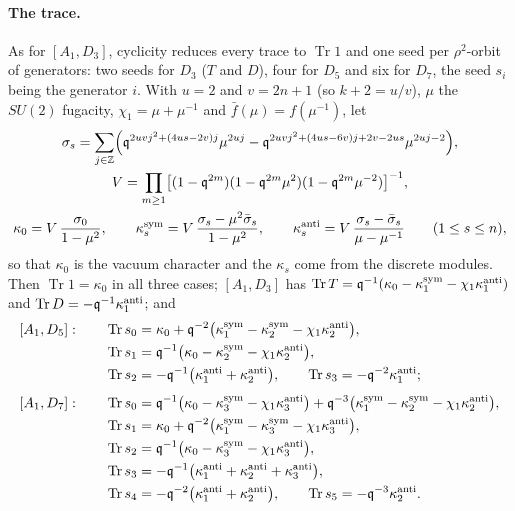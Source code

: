 \documentclass[11pt]{amsart}
\DeclareMathOperator{\Tr}{Tr}
\newcommand\fq{\mathfrak{q}}
\newcommand\bZ{\mathbb{Z}}
\theoremstyle{remark}
\begin{document}
\paragraph{The trace.}  As for $[A_1,D_3]$, cyclicity reduces every trace to
$\Tr1$ and one seed per $\rho^2$-orbit of generators: two seeds for $D_3$
($T$ and $D$), four for $D_5$ and six for $D_7$, the seed $s_i$ being the
generator $i$.  With $u=2$ and $v=2n+1$ (so $k+2=u/v$), $\mu$ the $SU(2)$
fugacity, $\chi_1=\mu+\mu^{-1}$ and $\bar f(\mu)=f(\mu^{-1})$, let
\begin{equation}\label{eq:comp-a1dodd-kappa}
\begin{gathered}
  \sigma_s=\sum_{j\in\bZ}\Bigl(\fq^{2uvj^2+(4us-2v)j}\mu^{2uj}
    -\fq^{2uvj^2+(4us-6v)j+2v-2us}\mu^{2uj-2}\Bigr),\\
  V=\prod_{m\ge1}\bigl[(1-\fq^{2m})(1-\fq^{2m}\mu^{2})(1-\fq^{2m}\mu^{-2})\bigr]^{-1},\\
  \kappa_0=V\,\frac{\sigma_0}{1-\mu^2},\qquad
  \kappa_s^{\rm sym}=V\,\frac{\sigma_s-\mu^2\bar\sigma_s}{1-\mu^2},\qquad
  \kappa_s^{\rm anti}=V\,\frac{\sigma_s-\bar\sigma_s}{\mu-\mu^{-1}}\qquad(1\le s\le n),
\end{gathered}
\end{equation}
so that $\kappa_0$ is the vacuum character and the $\kappa_s$ come from the
discrete modules.  Then $\Tr1=\kappa_0$ in all three cases; $[A_1,D_3]$ has
$\Tr T=\fq^{-1}(\kappa_0-\kappa_1^{\rm sym}-\chi_1\kappa_1^{\rm anti})$ and
$\Tr D=-\fq^{-1}\kappa_1^{\rm anti}$; and
\begin{equation}\label{eq:comp-a1dodd-seeds}
\begin{aligned}
  [A_1,D_5]:\qquad \Tr s_0&=\kappa_0+\fq^{-2}\bigl(\kappa_1^{\rm sym}-\kappa_2^{\rm sym}-\chi_1\kappa_2^{\rm anti}\bigr),\\
  \Tr s_1&=\fq^{-1}\bigl(\kappa_0-\kappa_2^{\rm sym}-\chi_1\kappa_2^{\rm anti}\bigr),\\
  \Tr s_2&=-\fq^{-1}\bigl(\kappa_1^{\rm anti}+\kappa_2^{\rm anti}\bigr),\qquad
  \Tr s_3=-\fq^{-2}\kappa_1^{\rm anti};\\[4pt]
  [A_1,D_7]:\qquad \Tr s_0&=\fq^{-1}\bigl(\kappa_0-\kappa_3^{\rm sym}-\chi_1\kappa_3^{\rm anti}\bigr)
     +\fq^{-3}\bigl(\kappa_1^{\rm sym}-\kappa_2^{\rm sym}-\chi_1\kappa_2^{\rm anti}\bigr),\\
  \Tr s_1&=\kappa_0+\fq^{-2}\bigl(\kappa_1^{\rm sym}-\kappa_3^{\rm sym}-\chi_1\kappa_3^{\rm anti}\bigr),\\
  \Tr s_2&=\fq^{-1}\bigl(\kappa_0-\kappa_3^{\rm sym}-\chi_1\kappa_3^{\rm anti}\bigr),\\
  \Tr s_3&=-\fq^{-1}\bigl(\kappa_1^{\rm anti}+\kappa_2^{\rm anti}+\kappa_3^{\rm anti}\bigr),\\
  \Tr s_4&=-\fq^{-2}\bigl(\kappa_1^{\rm anti}+\kappa_2^{\rm anti}\bigr),\qquad
  \Tr s_5=-\fq^{-3}\kappa_2^{\rm anti}.
\end{aligned}
\end{equation}
\end{document}
